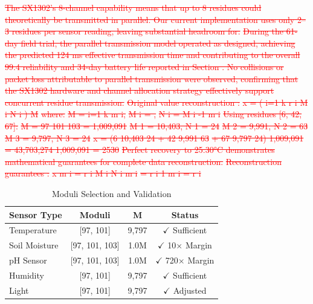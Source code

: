 \documentclass[pdflatex,sn-mathphys-num]{sn-jnl}
\theoremstyle{thmstyleone}
\theoremstyle{thmstyletwo}
\theoremstyle{thmstylethree}
\begin{document}
{\textcolor{red}{\sout{The SX1302's 8-channel capability means that up to 8 residues could theoretically be transmitted in parallel. Our current implementation uses only 2–3 residues per sensor reading, leaving substantial headroom for:}}
\textcolor{red}{\sout{During the 61-day field trial, the parallel transmission model operated as designed, achieving the predicted 124 ms effective transmission time and contributing to the overall 99.4 reliability and 34-day battery life reported in Section . No collisions or packet loss attributable to parallel transmission were observed, confirming that the SX1302 hardware and channel allocation strategy effectively support concurrent residue transmission.}}
\textcolor{red}{\sout{Original value reconstruction :}}
\textcolor{red}{\sout{x = ( i=1 k r i M i N i ) M}}
\textcolor{red}{\sout{where:}}
\textcolor{red}{\sout{M = i=1 k m i,}}
\textcolor{red}{\sout{M i = ,}}
\textcolor{red}{\sout{N i = M i -1 m i}}
\textcolor{red}{\sout{Using residues [6, 42, 67]:}}
\textcolor{red}{\sout{M = 97 101 103 = 1,009,091}}
\textcolor{red}{\sout{M 1 = 10,403, N 1 = 24}}
\textcolor{red}{\sout{M 2 = 9,991, N 2 = 63}}
\textcolor{red}{\sout{M 3 = 9,797, N 3 = 24}}
\textcolor{red}{\sout{x = (6 10,403 24 + 42 9,991 63}}
\textcolor{red}{\sout{+ 67 9,797 24) 1,009,091}}
\textcolor{red}{\sout{= 43,703,274 1,009,091 = 2530}}
\textcolor{red}{\sout{Perfect recovery to 25.30°C demonstrates mathematical guarantees for complete data reconstruction.}}
\textcolor{red}{\sout{Reconstruction guarantees :}}
\textcolor{red}{\sout{x m i = r i M i N i m i}}
\textcolor{red}{\sout{= r i 1 m i = r i}}

\begin{table}[htbp]
\caption{Moduli Selection and Validation}
\label{tab:moduli-validation}
\scriptsize
\centering
\begin{tabular}{p{}ccc}
\toprule
\textbf{Sensor Type} & \textbf{Moduli} & \textbf{M} & \textbf{Status} \\
\midrule
Temperature & [97, 101] & 9,797 & $\checkmark$ Sufficient \\
Soil Moisture & [97, 101, 103] & 1.0M & $\checkmark$ 10× Margin \\
pH Sensor & [97, 101, 103] & 1.0M & $\checkmark$ 720× Margin \\
Humidity & [97, 101] & 9,797 & $\checkmark$ Sufficient \\
Light & [97, 101] & 9,797 & $\checkmark$ Adjusted \\
\bottomrule
\end{tabular}
\end{table}

}
\end{document}
